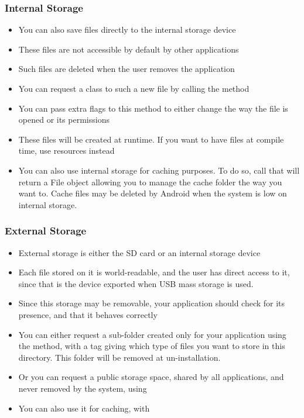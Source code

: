 \begin{frame}
  \frametitle{Internal Storage}
  \begin{itemize}
  \item You can also save files directly to the internal storage
    device
  \item These files are not accessible by default by other
    applications
  \item Such files are deleted when the user removes the application
  \item You can request a  class to such a new
    file by calling the method 
  \item You can pass extra flags to this method to either change the way the
    file is opened or its permissions
  \item These files will be created at runtime. If you want to have
    files at compile time, use resources instead
  \item You can also use internal storage for caching purposes. To do
    so, call  that will return a File object
    allowing you to manage the cache folder the way you want to. Cache
    files may be deleted by Android when the system is low on internal
    storage.
  \end{itemize}
\end{frame}

\begin{frame}
  \frametitle{External Storage}
  \begin{itemize}
  \item External storage is either the SD card or an internal storage
    device
  \item Each file stored on it is world-readable, and the user has
    direct access to it, since that is the device exported when USB
    mass storage is used.
  \item Since this storage may be removable, your application should
    check for its presence, and that it behaves correctly
  \item You can either request a sub-folder created only for your
    application using the  method, with a
    tag giving which type of files you want to store in this
    directory. This folder will be removed at un-installation.
  \item Or you can request a public storage space, shared by all
    applications, and never removed by the system, using
  \item You can also use it for caching, with 
  \end{itemize}
\end{frame}

